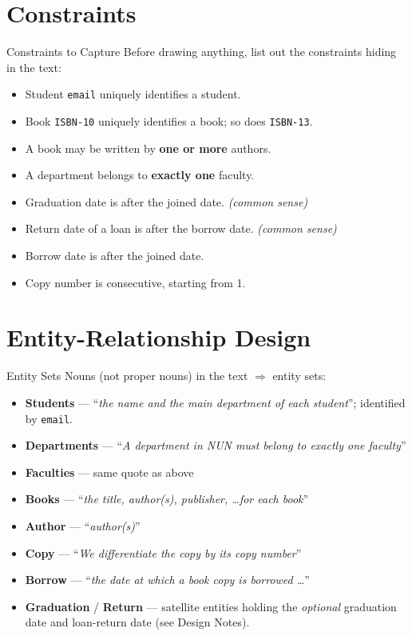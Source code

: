 \documentclass{beamer}
\begin{document}
\section{Constraints}

\begin{frame}{Constraints to Capture}
\small
Before drawing anything, list out the constraints hiding in the text:
\begin{itemize}
  \item Student \texttt{email} uniquely identifies a student.
  \item Book \texttt{ISBN-10} uniquely identifies a book; so does \texttt{ISBN-13}.
  \item A book may be written by \textbf{one or more} authors.
  \item A department belongs to \textbf{exactly one} faculty.
  \item Graduation date is after the joined date. \hfill\emph{(common sense)}
  \item Return date of a loan is after the borrow date. \hfill\emph{(common sense)}
  \item Borrow date is after the joined date.
  \item Copy number is consecutive, starting from 1.
\end{itemize}
\end{frame}

\section{Entity-Relationship Design}

\begin{frame}{Entity Sets}
\small
Nouns (not proper nouns) in the text $\Rightarrow$ entity sets:
\begin{itemize}
  \item \textbf{Students} --- ``\textit{the name and the main department of each student}''; identified by \texttt{email}.
  \item \textbf{Departments} --- ``\textit{A department in NUN must belong to exactly one faculty}''
  \item \textbf{Faculties} --- same quote as above
  \item \textbf{Books} --- ``\textit{the title, author(s), publisher, \dots for each book}''
  \item \textbf{Author} --- ``\textit{author(s)}''
  \item \textbf{Copy} --- ``\textit{We differentiate the copy by its copy number}''
  \item \textbf{Borrow} --- ``\textit{the date at which a book copy is borrowed \dots}''
  \item \textbf{Graduation} / \textbf{Return} --- satellite entities holding the \emph{optional} graduation date and loan-return date (see Design Notes).
\end{itemize}
\end{frame}
\end{document}
